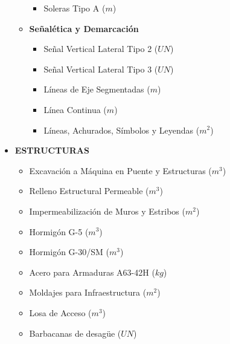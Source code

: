 \begin{itemize}
\begin{itemize}
\begin{itemize}
            \item Soleras Tipo A ($m$)
        \end{itemize}
        \item \textbf{Señalética y Demarcación}
        \begin{itemize}
            \item Señal Vertical Lateral Tipo 2 ($UN$)
            \item Señal Vertical Lateral Tipo 3 ($UN$)
            \item Líneas de Eje Segmentadas ($m$)
            \item Línea Continua ($m$)
            \item Líneas, Achurados, Símbolos y Leyendas ($m^2$)
        \end{itemize}
    \end{itemize}
    \item \textbf{ESTRUCTURAS}
    \begin{itemize}
        \item Excavación a Máquina en Puente y Estructuras ($m^3$)
        \item Relleno Estructural Permeable ($m^3$)
        \item Impermeabilización de Muros y Estribos ($m^2$)
        \item Hormigón G-5 ($m^3$)
        \item Hormigón G-30/SM ($m^3$)
        \item Acero para Armaduras A63-42H ($kg$)
        \item Moldajes para Infraestructura ($m^2$)
        \item Losa de Acceso ($m^3$)
        \item Barbacanas de desagüe ($UN$)
    \end{itemize}
\end{itemize}
